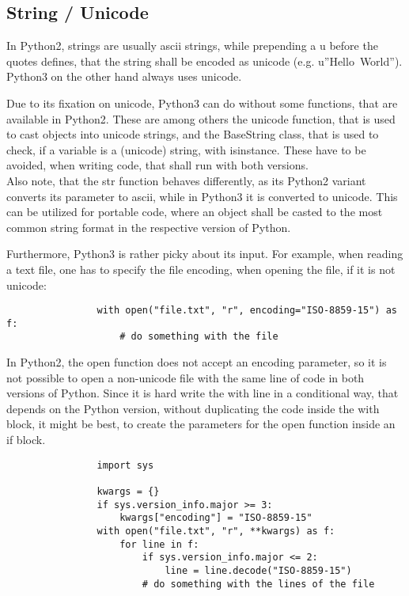 		\subsection{String / Unicode}
			In Python2, strings are usually ascii strings, while prepending a {\normalfont \ttfamily u} before the quotes defines, that the string shall be encoded as unicode (e.g. {\normalfont \ttfamily u''Hello~World''}).
			Python3 on the other hand always uses unicode.

			Due to its fixation on unicode, Python3 can do without some functions, that are available in Python2.
			These are among others the {\normalfont \ttfamily unicode} function, that is used to cast objects into unicode strings, and the {\normalfont \ttfamily BaseString} class, that is used to check, if a variable is a (unicode) string, with {\normalfont \ttfamily isinstance}.
			These have to be avoided, when writing code, that shall run with both versions.\\
			Also note, that the {\normalfont \ttfamily str} function behaves differently, as its Python2 variant converts its parameter to ascii, while in Python3 it is converted to unicode.
			This can be utilized for portable code, where an object shall be casted to the most common string format in the respective version of Python.

			Furthermore, Python3 is rather picky about its input.
			For example, when reading a text file, one has to specify the file encoding, when opening the file, if it is not unicode:
			\begin{verbatim}
				with open("file.txt", "r", encoding="ISO-8859-15") as f:
					# do something with the file
			\end{verbatim}
			In Python2, the {\normalfont \ttfamily open} function does not accept an {\normalfont \ttfamily encoding} parameter, so it is not possible to open a non-unicode file with the same line of code in both versions of Python.
			Since it is hard write the {\normalfont \ttfamily with} line in a conditional way, that depends on the Python version, without duplicating the code inside the {\normalfont \ttfamily with} block, it might be best, to create the parameters for the {\normalfont \ttfamily open} function inside an {\normalfont \ttfamily if} block.
			\begin{verbatim}
				import sys

				kwargs = {}
				if sys.version_info.major >= 3:
					kwargs["encoding"] = "ISO-8859-15"
				with open("file.txt", "r", **kwargs) as f:
					for line in f:
						if sys.version_info.major <= 2:
							line = line.decode("ISO-8859-15")
						# do something with the lines of the file
			\end{verbatim}

